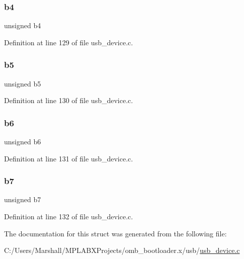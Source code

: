 \mbox{\label{structuint8__t___v_a_l_1_1_____p_a_c_k_e_d_a02783ce5c818bd5feee68ec745a658ea}} 
\subsubsection{\texorpdfstring{b4}{b4}}
{\footnotesize\ttfamily unsigned b4}



Definition at line 129 of file usb\+\_\+device.\+c.

\mbox{\label{structuint8__t___v_a_l_1_1_____p_a_c_k_e_d_aabfdfc34204bc98e9f2228285847ec9f}} 
\subsubsection{\texorpdfstring{b5}{b5}}
{\footnotesize\ttfamily unsigned b5}



Definition at line 130 of file usb\+\_\+device.\+c.

\mbox{\label{structuint8__t___v_a_l_1_1_____p_a_c_k_e_d_a36234c4fc61c0ce84b860356586340a9}} 
\subsubsection{\texorpdfstring{b6}{b6}}
{\footnotesize\ttfamily unsigned b6}



Definition at line 131 of file usb\+\_\+device.\+c.

\mbox{\label{structuint8__t___v_a_l_1_1_____p_a_c_k_e_d_a52df3becc9eb59ad64eb7a4acad36c01}} 
\subsubsection{\texorpdfstring{b7}{b7}}
{\footnotesize\ttfamily unsigned b7}



Definition at line 132 of file usb\+\_\+device.\+c.



The documentation for this struct was generated from the following file\+:\begin{DoxyCompactItemize}
\item 
C\+:/\+Users/\+Marshall/\+M\+P\+L\+A\+B\+X\+Projects/omb\+\_\+bootloader.\+x/usb/\mbox{\hyperlink{usb__device_8c}{usb\+\_\+device.\+c}}\end{DoxyCompactItemize}
